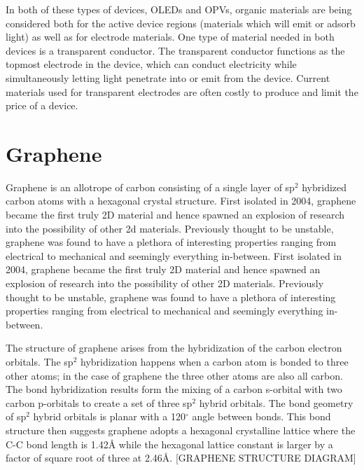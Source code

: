 In both of these types of devices, OLEDs and OPVs, organic materials are being considered both for the active device regions (materials which will emit or adsorb light) as well as for electrode materials. One type of material needed in both devices is a transparent conductor. The transparent conductor functions as the topmost electrode in the device, which can conduct electricity while simultaneously letting light penetrate into or emit from the device. Current materials used for transparent electrodes are often costly to produce and limit the price of a device.

\section{Graphene}
Graphene is an allotrope of carbon consisting of a single layer of sp$^2$ hybridized carbon atoms with a hexagonal crystal structure. First isolated in 2004, graphene became the first truly 2D material and hence spawned an explosion of research into the possibility of other 2d materials. Previously thought to be unstable, graphene was found to have a plethora of interesting properties ranging from electrical to mechanical and seemingly everything in-between. First isolated in 2004, graphene became the first truly 2D material and hence spawned an explosion of research into the possibility of other 2D materials. Previously thought to be unstable, graphene was found to have a plethora of interesting properties ranging from electrical to mechanical and seemingly everything in-between.

The structure of graphene arises from the hybridization of the carbon electron orbitals. The sp$^2$ hybridization happens when a carbon atom is bonded to three other atoms; in the case of graphene the three other atoms are also all carbon. The bond hybridization results form the mixing of a carbon s-orbital with two carbon p-orbitals to create a set of three sp$^2$ hybrid orbitals. The bond geometry of sp$^2$ hybrid orbitals is planar with a 120$^{\circ}$ angle between bonds. This bond structure then suggests graphene adopts a hexagonal crystalline lattice where the C-C bond length is 1.42{\AA} while the hexagonal lattice constant is larger by a factor of square root of three at 2.46{\AA}. [GRAPHENE STRUCTURE DIAGRAM]

